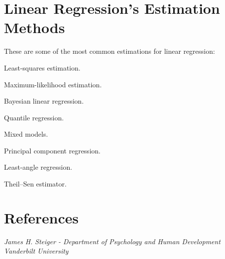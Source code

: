 \documentclass{article}
\begin{document}
\section {Linear Regression's Estimation Methods}
    
    These are some of the most common estimations for linear regression: 

    Least-squares estimation.
    
    Maximum-likelihood estimation.
    
    Bayesian linear regression.
    
    Quantile regression.
    
    Mixed models.
    
    Principal component regression.
    
    Least-angle regression.
    
    Theil–Sen estimator.
    
    \vspace{\baselineskip}
    
\section {References}
    \textit{James H. Steiger - Department of Psychology and Human Development Vanderbilt University}
%   
%    
%    
\end{document}

